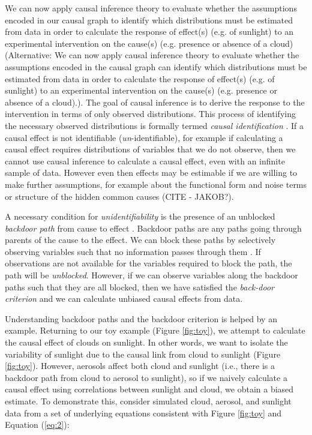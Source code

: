 \documentclass[12pt]{article}
\begin{document}
We can now apply causal inference theory
\citep[e.g.,][]{pearl1995causal,shpitser2006} to evaluate whether the
assumptions encoded in our causal graph to identify which
distributions must be estimated from data in order to calculate the
response of effect(s) (e.g. of sunlight) to an experimental
intervention on the cause(s) (e.g. presence or absence of a cloud)
(Alternative: We can now apply causal inference theory
\citep[e.g.,][]{pearl1995causal,tian2002general} to evaluate whether
the assumptions encoded in the causal graph can identify which
distributions must be estimated from data in order to calculate the
response of effect(s) (e.g. of sunlight) to an experimental
intervention on the cause(s) (e.g. presence or absence of a
cloud).). The goal of causal inference is to derive the response to
the intervention in terms of only observed distributions. This process
of identifying the necessary observed distributions is formally termed
\emph{causal identification} \citep[][, Ch. 3]{pearl2009causality}. If
a causal effect is not identifiable (\emph{un}-identifiable), for
example if calculating a causal effect requires distributions of
variables that we do not observe, then we cannot use causal inference
to calculate a causal effect, even with an infinite sample of
data. However even then effects may be estimable if we are willing to
make further assumptions, for example about the functional form and
noise terms or structure of the hidden common causes (CITE - JAKOB?).

A necessary condition for \emph{unidentifiability} is the presence of
an unblocked \emph{backdoor path} from cause to effect \citep[][,
Ch. 3]{pearl2009causality}. Backdoor paths are any paths going
through parents of the cause to the effect. We can block these paths
by selectively observing variables such that no information passes
through them \citep{geiger-d-sep}. If observations are not available
for the variables required to block the path, the path will be
\emph{unblocked}. However, if we can observe variables along the
backdoor paths such that they are all blocked, then we have satisfied
the \emph{back-door criterion} \citep{pearl2009} and we can calculate
unbiased causal effects from data.

Understanding backdoor paths and the backdoor criterion is helped by
an example. Returning to our toy example (Figure \ref{fig:toy}), we
attempt to calculate the causal effect of clouds on sunlight. In other
words, we want to isolate the variability of sunlight due to the
causal link from cloud to sunlight (Figure \ref{fig:toy}). However,
aerosols affect both cloud and sunlight (i.e., there is a backdoor
path from cloud to aerosol to sunlight), so if we naively calculate a
causal effect using correlations between sunlight and cloud, we obtain
a biased estimate. To demonstrate this, consider simulated cloud,
aerosol, and sunlight data from a set of underlying equations
consistent with Figure \ref{fig:toy} and Equation (\ref{eq:2}):
\end{document}
